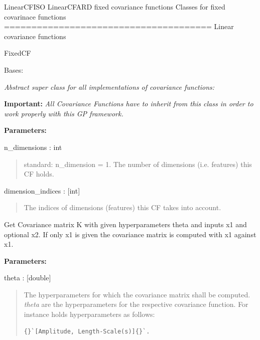 \documentclass[letterpaper,10pt,english]{sphinxmanual}
\begin{document}
LinearCFISO
LinearCFARD
\label{covars:module-pygp.covar.fixed}
fixed covariance functions
Classes for fixed covarinace functions
======================================
Linear covariance functions

FixedCF

\begin{fulllineitems}
\label{covars:pygp.covar.CovarianceFunction}
Bases: 

\emph{Abstract super class for all implementations of covariance functions:}

\textbf{Important:} \emph{All Covariance Functions have
to inherit from this class in order to work
properly with this GP framework.}

\textbf{Parameters:}

n\_dimensions : int
\begin{quote}

standard: n\_dimension = 1. The number of
dimensions (i.e. features) this CF holds.
\end{quote}

dimension\_indices : {[}int{]}
\begin{quote}

The indices of dimensions (features) this CF takes into account.
\end{quote}

\begin{fulllineitems}
\label{covars:pygp.covar.CovarianceFunction.K}
Get Covariance matrix K with given hyperparameters
theta and inputs x1 and optional x2.
If only x1 is given the covariance
matrix is computed with x1 against x1.

\textbf{Parameters:}

theta : {[}double{]}
\begin{quote}

The hyperparameters for which the covariance
matrix shall be computed. \emph{theta} are the
hyperparameters for the respective covariance function.
For instance 
holds hyperparameters as follows:

\begin{Verbatim}[commandchars=\\\{\}]
{}`[Amplitude, Length-Scale(s)]{}`.
\end{Verbatim}
\end{quote}


\end{fulllineitems}
\end{fulllineitems}
\end{document}

